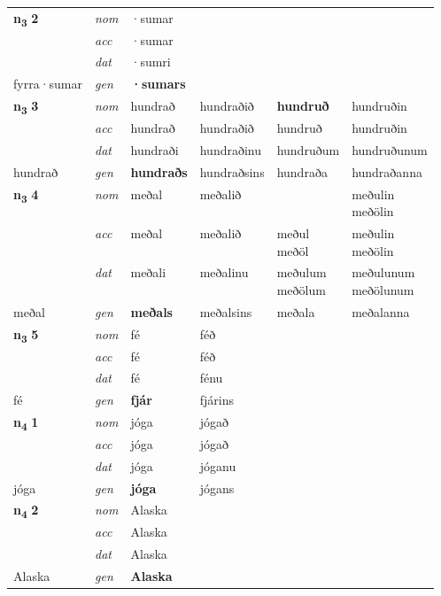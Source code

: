 \begin{longtable}[l]{X>{\footnotesize\itshape}XXXXX}
\multirow{3}{*}{{{\textbf{n{\textsubscript{3}}} \Large{\textbf{2}}}}} & nom & ·sumar &  & \textbf{} &  \\*
 & acc & ·sumar &  &  &  \\*
 & dat & ·sumri &  &  &  \\*
 {\footnotesize{fyrra\allowbreak ·sumar}} & gen & \textbf{·sumars} &  &  &  \\
\cmidrule{1-6}

\multirow{3}{*}{{{\textbf{n{\textsubscript{3}}} \Large{\textbf{3}}}}} & nom & hundrað & hundraðið & \textbf{hundruð} & hundruðin \\*
 & acc & hundrað & hundraðið & hundruð & hundruðin \\*
 & dat & hundraði & hundraðinu & hundruðum & hundruðunum \\*
 {\footnotesize{hundrað}} & gen & \textbf{hundraðs} & hundraðsins & hundraða & hundraðanna \\

 
\multirow{3}{*}{{{\textbf{n{\textsubscript{3}}} \Large{\textbf{4}}}}} & nom & meðal & meðalið & \textbf{\specialcell{meðul\\ meðöl}} & \specialcell{meðulin\\ meðölin} \\*
 & acc & meðal & meðalið & \specialcell{meðul\\ meðöl} & \specialcell{meðulin\\ meðölin} \\*
 & dat & meðali & meðalinu & \specialcell{meðulum\\ meðölum} & \specialcell{meðulunum\\ meðölunum} \\*
 {\footnotesize{meðal}} & gen & \textbf{meðals} & meðalsins & meðala & meðalanna \\
\cmidrule{1-6}

\multirow{3}{*}{{{\textbf{n{\textsubscript{3}}} \Large{\textbf{5}}}}} & nom & fé & féð & \textbf{} &  \\*
 & acc & fé & féð &  &  \\*
 & dat & fé & fénu &  &  \\*
 {\footnotesize{fé}} & gen & \textbf{fjár} & fjárins &  &  \\
\cmidrule{1-6}

\multirow{3}{*}{{{\textbf{n{\textsubscript{4}}} \Large{\textbf{1}}}}} & nom & jóga & jógað & \textbf{} &  \\*
 & acc & jóga & jógað &  &  \\*
 & dat & jóga & jóganu &  &  \\*
 {\footnotesize{jóga}} & gen & \textbf{jóga} & jógans &  &  \\
\cmidrule{1-6}

\multirow{3}{*}{{{\textbf{n{\textsubscript{4}}} \Large{\textbf{2}}}}} & nom & Alaska &  & \textbf{} &  \\*
 & acc & Alaska &  &  &  \\*
 & dat & Alaska &  &  &  \\*
 {\footnotesize{Alaska}} & gen & \textbf{Alaska} &  &  &  \\
\end{longtable}
